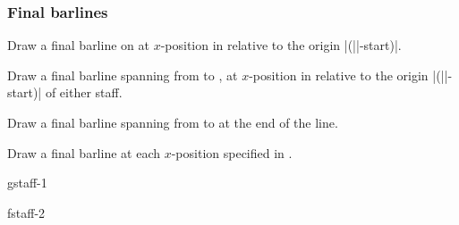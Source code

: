 \subsubsection{Final barlines}\label{sec:multistaff:barlines:final}
\begin{command}{\tmfinalbarline{}}
  Draw a final barline on  at $x$-position  in 
  relative to the origin |(||-start)|.
\end{command}
\begin{command}{\tmfinalbarline*{}}
  Draw a final barline spanning from  to 
  , at $x$-position  in relative to 
  the origin |(||-start)| of either staff.
\end{command}
\begin{command}{\tmfinalbarlineendline{}}
  Draw a final barline spanning from  to 
   at the end of the line.
\end{command}
\begin{command}{\tmfinalbarlineinline{}}
  Draw a final barline at each $x$-position specified in .
\end{command}
\begin{codeexample}[]
\begin{tmline}%
\begin{tmstaff}{g}{staff-1}\end{tmstaff}%
\begin{tmstaff}{f}{staff-2}
\end{tmstaff}%
%
%
%
%
\end{tmline}
\end{codeexample}
